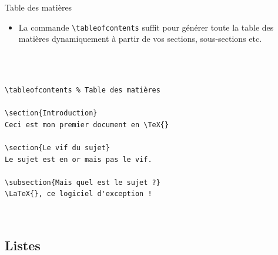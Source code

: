 \begin{frame}[fragile]{Table des matières}
  \begin{itemize}
      \item La commande \lstinline|\tableofcontents| suffit pour générer toute la table des matières dynamiquement à partir de vos sections, sous-sections etc.
  \end{itemize}
  \begin{columns}
    \begin{column}{0.6\textwidth}
      \begin{lstlisting}[style=nonumbers]


\tableofcontents % Table des matières

\section{Introduction}
Ceci est mon premier document en \TeX{}

\section{Le vif du sujet}
Le sujet est en or mais pas le vif.

\subsection{Mais quel est le sujet ?}
\LaTeX{}, ce logiciel d'exception !


      \end{lstlisting}
    \end{column}
    \begin{column}{0.4\textwidth}
      \begin{center}
      \end{center}
    \end{column}
  \end{columns}
\end{frame}

\subsection{Listes}

